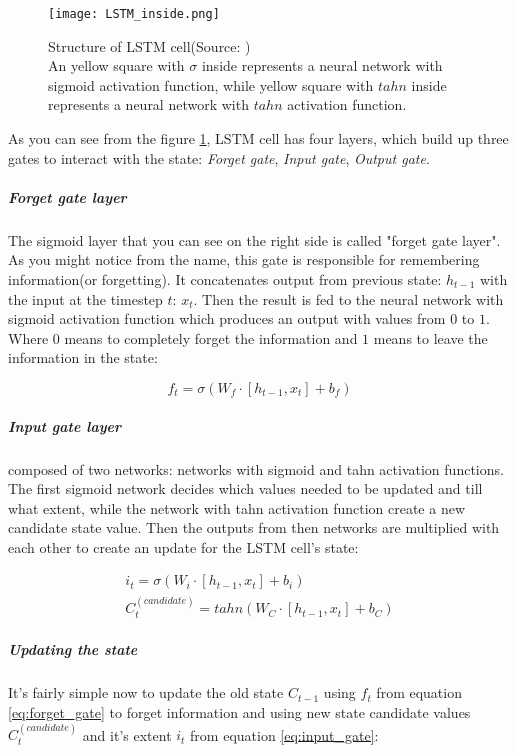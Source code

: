\begin{figure}[H]
	\texttt{[image: LSTM\_inside.png]}
	\caption{
		Structure of LSTM cell(Source: \cite{ColahChristopher2015}) \\
		An yellow square with $\sigma$ inside represents a neural
		network with sigmoid activation function, while yellow square with $tahn$ inside represents
		a neural network with $tahn$ activation function.}

	\label{img:lstm} %
\end{figure}


As you can see from the figure \ref{img:lstm}, LSTM cell has four layers,
which build up three gates to interact with the state:
\emph{Forget gate}, \emph{Input gate}, \emph{Output gate}.


\subparagraph{Forget gate layer}
The sigmoid layer that you can see on the right side is
called "forget gate layer". As you might notice from the name, this gate is responsible
for remembering information(or forgetting). It concatenates output from previous state: $h_{t-1}$
with the input at the timestep $t$: $x_t$. Then the result is fed to the neural network
with sigmoid activation function which produces an output with values from $0$ to $1$.
Where 0 means to completely forget the information and $1$ means to leave
the information in the state:

\begin{equation} \label{eq:forget_gate}
	f_t = \sigma (W_f \cdot [h_{t-1}, x_t] + b_f)
\end{equation}

\subparagraph{Input gate layer} composed of two networks: networks with sigmoid
and tahn activation functions. The first sigmoid network decides which values needed
to be updated and till what extent, while the network with tahn activation function create a
new candidate state value. Then the outputs from then networks are multiplied with each other
to create an update for the LSTM cell's state:

\begin{align} \label{eq:input_gate}
	i_t = \sigma (W_i \cdot [h_{t-1}, x_t] + b_i) \nonumber\\
	C_t^{(candidate)} = tahn(W_C \cdot [h_{t-1}, x_t] + b_C)
\end{align}

\subparagraph{Updating the state}
It's fairly simple now to update the old state $C_{t-1}$ using $f_t$ from equation
\ref{eq:forget_gate} to forget information and using new state candidate values
$C_t^{(candidate)}$ and it's extent $i_t$ from equation \ref{eq:input_gate}:

